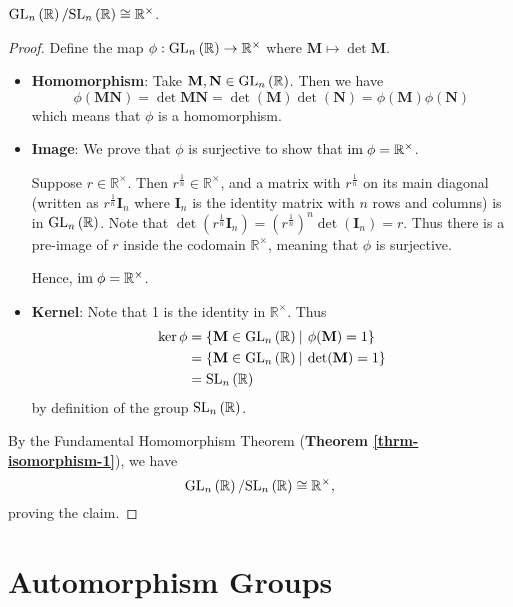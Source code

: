 \begin{proposition}
    $\mathrm{GL}_{n}\left(\mathbb{R}\right) / \mathrm{SL}_{n}\left(\mathbb{R}\right) \cong \mathbb{R}^\times$.
\end{proposition}
\begin{proof}
    Define the map $\phi: \mathrm{GL}_{n}\left(\mathbb{R}\right) \to \mathbb{R}^\times$ where $\textbf{M} \mapsto \det\textbf{M}$.
	\begin{itemize}
	    \item \textbf{Homomorphism}: Take $\textbf{M}, \textbf{N} \in \mathrm{GL}_{n}\left(\mathbb{R}\right)$. Then we have
	    \[
	        \phi(\textbf{MN}) = \det \textbf{MN} = \det(\textbf{M})\det(\textbf{N}) = \phi(\textbf{M})\phi(\textbf{N})
	    \]
	    which means that $\phi$ is a homomorphism.

	    \item \textbf{Image}: We prove that $\phi$ is surjective to show that $\mathrm{im}\; \phi = \mathbb{R}^\times$.

	    Suppose $r \in \mathbb{R}^\times$. Then $r^{\frac1n} \in \mathbb{R}^\times$, and a matrix with $r^{\frac1n}$ on its main diagonal (written as $r^{\frac1n}\textbf{I}_n$ where $\textbf{I}_n$ is the identity matrix with $n$ rows and columns) is in $\mathrm{GL}_{n}\left(\mathbb{R}\right)$. Note that $\det(r^{\frac1n}\textbf{I}_n) = \left(r^{\frac1n}\right)^n\det(\textbf{I}_n) = r$. Thus there is a pre-image of $r$ inside the codomain $\mathbb{R}^\times$, meaning that $\phi$ is surjective.

	    Hence, $\mathrm{im}\; \phi = \mathbb{R}^\times$.

	    \item \textbf{Kernel}: Note that 1 is the identity in $\mathbb{R}^\times$. Thus
	    \begin{align*}
	        \ker\phi &= \{\textbf{M} \in \GL{n}{\mathbb{R}} \vert \phi(\textbf{M}) = 1\} \\
	        &= \{\textbf{M} \in \GL{n}{\mathbb{R}} \vert \det(\textbf{M}) = 1\}\\
	        &= \SL{n}{\mathbb{R}}
	    \end{align*}
	    by definition of the group $\mathrm{SL}_{n}\left(\mathbb{R}\right)$.
	\end{itemize}
	By the Fundamental Homomorphism Theorem (\textbf{Theorem \ref{thrm-isomorphism-1}}), we have
	\[
	    \mathrm{GL}_{n}\left(\mathbb{R}\right) / \mathrm{SL}_{n}\left(\mathbb{R}\right) \cong \mathbb{R}^\times,
	\]
	proving the claim.
\end{proof}

\section{Automorphism Groups}
